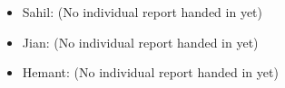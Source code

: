 \documentclass{letter}
\begin{document}
\begin{itemize}
        
    \item Sahil: (No individual report handed in yet)
    \item Jian: (No individual report handed in yet)
    \item Hemant: (No individual report handed in yet)
%        
        
     \end{itemize}
 
 
\end{document}

